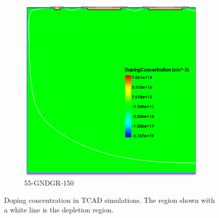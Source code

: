 \begin{figure}[htbp]
  \begin{subfigure}[b]{0.5\linewidth}
    \includegraphics[width=\textwidth]{figures/TCAD/dopingConcentration_55_GNDGR_150.png}
    \caption{55-GNDGR-150}
  \end{subfigure}
  \caption{Doping concentration in TCAD simulations. The region shown
    with a white line is the depletion region.}
  \label{fig:TCAD_dopingConcentration}
\end{figure}
